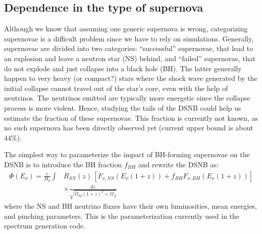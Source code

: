 \documentclass[12pt]{article}
\begin{document}
\subsection{Dependence in the type of supernova}
Although we know that assuming one generic supernova is wrong, categorizing supernovae is a difficult problem since we have to rely on simulations. Generally, supernovae are divided into two categories: ``successful'' supernovae, that lead to an explosion and leave a neutron star (NS) behind, and ``failed'' supernovae, that do not explode and just collapse into a black hole (BH). The latter generally happen to very heavy (or compact?) stars where the shock wave generated by the initial collapse cannot travel out of the star's core, even with the help of neutrinos. The neutrinos emitted are typically more energetic since the collapse process is more violent. Hence, studying the tails of the DSNB could help us estimate the fraction of these supernovae. This fraction is currently not known, as no such supernova has been directly observed yet (current upper bound is about $44$\%).  

The simplest way to parameterize the impact of BH-forming supernovae on the DSNB is to introduce the BH fraction $f_{BH}$ and rewrite the DSNB as:
    \begin{align}
        \Phi(E_\nu) = \frac{c}{H_0}\int & R_{SN}(z)\,\left[F_{\nu, NS}(E_\nu (1 + z)) + f_{BH}F_{\nu, BH}(E_\nu (1 + z))\right]\\
    & \times \frac{dz}{\sqrt{\Omega_M(1+z)^3 + \Omega_\Lambda}}
    \label{eq:BH1}
    \end{align}
    where the NS and BH neutrino fluxes have their own luminosities, mean energies, and pinching parameters. This is the parameterization currently used in the spectrum generation code.
\end{document}
